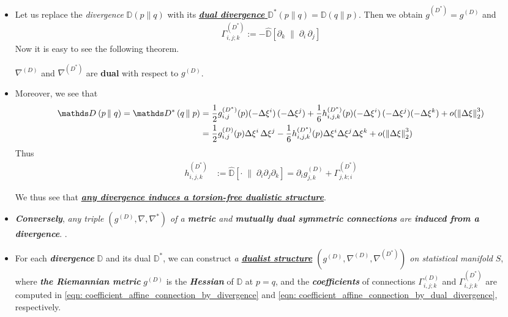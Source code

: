 \documentclass[11pt]{article}
\begin{document}
\begin{itemize}
\item Let us replace the \emph{divergence} $\mathds{D}(p \| q)$ with its \underline{\emph{\textbf{dual divergence}} $\mathds{D}^{*}(p \| q) = \mathds{D}(q \| p)$}.
Then we obtain $g^{(D^{*})} =g^{(D)}$ and
\begin{align}
\Gamma_{i,j; k}^{(D^{*})} := -\widehat{\mathds{D}}\left[\partial_k   \;\|\; \partial_i\,\partial_j  \right] \label{eqn: coefficient_affine_connection_by_dual_divergence}
\end{align}
Now it is easy to see the following theorem.

\begin{theorem}
$\nabla^{(D)}$ and $\nabla^{(D^{*})}$ are \textbf{dual} with respect to $g^{(D)}$.
\end{theorem}

\item Moreover, we see that
\begin{align*}
\divg{}{p}{q} = \divg{*}{q}{p} &= \frac{1}{2}g_{i,j}^{(D^{*})}(p)(-\Delta\xi^i)\,(-\Delta\xi^j) + \frac{1}{6}h_{i,j,k}^{(D^{*})}(p)(-\Delta\xi^i)\,(-\Delta\xi^j)(-\Delta\xi^k )+ o(\norm{\Delta \xi}{2}^3) \\
&= \frac{1}{2}g_{i,j}^{(D)}(p)\Delta\xi^i\,\Delta\xi^j - \frac{1}{6}h_{i,j,k}^{(D^{*})}(p)\Delta\xi^i\Delta\xi^j\Delta\xi^k + o(\norm{\Delta \xi}{2}^3)
\end{align*}
Thus
\begin{align*}
h_{i,j,k}^{(D^{*})} &:=  \widehat{\mathds{D}}\left[ \cdot  \;\|\;   \partial_i \partial_j \partial_k\right]  = \partial_i g_{j,k}^{(D)}  + \Gamma_{j,k;i}^{(D^{*})}
\end{align*}

We thus see that \underline{\emph{\textbf{any divergence induces a torsion-free dualistic structure}}}.

\item  \emph{\textbf{Conversely}},  \emph{any triple $(g^{(D)}, \nabla, \nabla^{*})$ of a \textbf{metric} and \textbf{mutually dual symmetric connections} are \textbf{induced from a divergence}}. \citep{amari2007methods}.

\item \begin{remark}
For each \emph{\textbf{divergence}} $\mathds{D}$ and its dual $\mathds{D}^{*}$, we can construct \emph{a \underline{\textbf{dualist structure}} $(g^{(D)}, \nabla^{(D)}, \nabla^{(D^{*})})$ on statistical manifold} $S$, where \emph{\textbf{the Riemannian metric}} $g^{(D)}$ is the \emph{\textbf{Hessian}} of $\mathds{D}$ at $p=q$, and the \emph{\textbf{coefficients}} of connections $\Gamma_{i,j; k}^{(D)}$ and $\Gamma_{i,j; k}^{(D^{*})}$ are computed in \eqref{eqn: coefficient_affine_connection_by_divergence} and \eqref{eqn: coefficient_affine_connection_by_dual_divergence}, respectively.
\end{remark}
\end{itemize}
\end{document}
